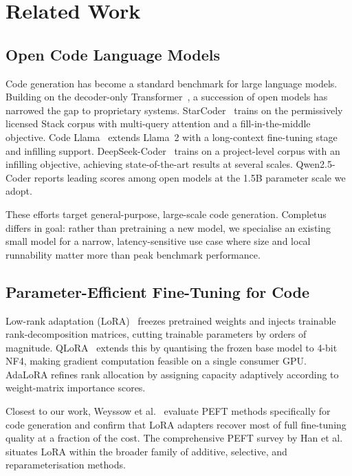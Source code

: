 \section{Related Work}

\subsection{Open Code Language Models}

Code generation has become a standard benchmark for large language
models. Building on the decoder-only Transformer~\cite{Vaswani2017Attention},
a succession of open models has narrowed the gap to proprietary
systems. StarCoder~\cite{Li2023StarCoder} trains on the permissively
licensed Stack corpus with multi-query attention and a
fill-in-the-middle objective. Code Llama~\cite{Roziere2023CodeLlama}
extends Llama~2 with a long-context fine-tuning stage and infilling
support. DeepSeek-Coder~\cite{Guo2024DeepSeek} trains on a
project-level corpus with an infilling objective, achieving
state-of-the-art results at several scales. Qwen2.5-Coder
\cite{Hui2024Qwen25} reports leading scores among open models at the
1.5B parameter scale we adopt.

These efforts target general-purpose, large-scale code generation.
Completus differs in goal: rather than pretraining a new model, we
specialise an existing small model for a narrow, latency-sensitive use
case where size and local runnability matter more than peak benchmark
performance.

\subsection{Parameter-Efficient Fine-Tuning for Code}

Low-rank adaptation (LoRA)~\cite{Hu2021LoRA} freezes pretrained
weights and injects trainable rank-decomposition matrices, cutting
trainable parameters by orders of magnitude. QLoRA~\cite{Dettmers2023QLoRA}
extends this by quantising the frozen base model to 4-bit NF4, making
gradient computation feasible on a single consumer GPU. AdaLoRA
\cite{Zhang2023AdaLoRA} refines rank allocation by assigning capacity
adaptively according to weight-matrix importance scores.

Closest to our work, Weyssow et al.~\cite{Weyssow2023PEFT} evaluate
PEFT methods specifically for code generation and confirm that LoRA
adapters recover most of full fine-tuning quality at a fraction of
the cost. The comprehensive PEFT survey by Han et
al.~\cite{Han2024PEFTSurvey} situates LoRA within the broader family
of additive, selective, and reparameterisation methods.

